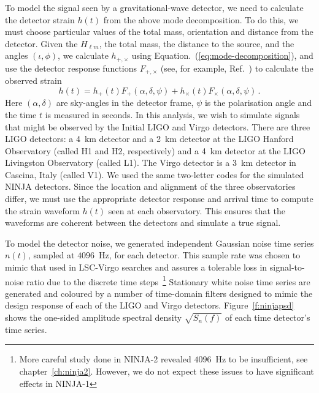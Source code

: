 To model the signal seen by a gravitational-wave detector, we need to
calculate the detector strain $h(t)$ from the above mode
decomposition. To do this, we must choose particular values of the
total mass, orientation and distance from the detector.  Given the
$H_{\ell m}$, the total mass, the distance to the source, and the
angles $(\iota,\phi)$, we calculate $h_{+,\times}$ using
Equation.~(\ref{eq:mode-decomposition}), and use the detector response
functions $F_{+,\times}$ (see, for example, Ref.~\cite{thorne.k:1987})
to calculate the observed strain
\begin{equation}
  h(t) = h_+(t) F_+(\alpha,\delta,\psi) + h_\times(t) F_\times(\alpha,\delta,\psi)\,.
\end{equation} %
%
Here $(\alpha,\delta)$ are sky-angles in the detector frame, $\psi$ is
the polarisation angle and the time $t$ is measured in seconds. In
this analysis, we wish to simulate signals that might be observed by
the Initial LIGO and Virgo detectors. There are three LIGO detectors:
a 4~km detector and a 2~km detector at the LIGO Hanford Observatory
(called H1 and H2, respectively) and a 4~km detector at the LIGO
Livingston Observatory (called L1). The Virgo detector is a 3~km
detector in Cascina, Italy (called V1). We used the same two-letter
codes for the simulated NINJA detectors.  Since the location and
alignment of the three observatories differ, we must use the
appropriate detector response and arrival time to compute the strain
waveform $h(t)$ seen at each observatory. This ensures that the
waveforms are coherent between the detectors and simulate a true
signal.

To model the detector noise, we generated independent Gaussian noise
time series $n(t)$, sampled at $4096$~Hz, for each detector. This
sample rate was chosen to mimic that used in LSC-Virgo searches and
assures a tolerable loss in signal-to-noise ratio due to the discrete
time steps~\footnote{More careful study done in NINJA-2 revealed
$4096$~Hz to be insufficient, see chapter~\ref{ch:ninja2}.  However, we
do not expect these issues to have significant effects in NINJA-1}
Stationary white noise time series are generated and coloured by a
number of time-domain filters designed to mimic  the design response
of each of the LIGO and Virgo detectors. Figure~\ref{f:ninjapsd}
shows the one-sided amplitude spectral density $\sqrt{S_n(f)}$ of each
time detector's time series.

